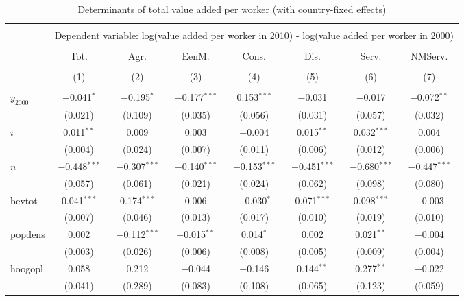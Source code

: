 
\begin{table} \centering \small
  \caption{Determinants of total value added per worker (with country-fixed effects)} 
  \label{FEtable} 
\begin{tabular}{@{\extracolsep{5pt}}lccccccc} 
\\[-1.8ex]\hline 
\hline \\[-1.8ex] 
 & \multicolumn{7}{c}{Dependent variable: log(value added per worker in 2010) - log(value added per worker in 2000)} \\ 
\cline{2-8} 
\\[-1.8ex] & Tot. & Agr. & EenM. & Cons. & Dis. & Serv. & NMServ. \\ 
\\[-1.8ex] & (1) & (2) & (3) & (4) & (5) & (6) & (7)\\ 
\hline \\[-1.8ex] 
 $y_{2000}$ & $-$0.041$^{*}$ & $-$0.195$^{*}$ & $-$0.177$^{***}$ & 0.153$^{***}$ & $-$0.031 & $-$0.017 & $-$0.072$^{**}$ \\ 
  & (0.021) & (0.109) & (0.035) & (0.056) & (0.031) & (0.057) & (0.032) \\ 
  $i$ & 0.011$^{**}$ & 0.009 & 0.003 & $-$0.004 & 0.015$^{**}$ & 0.032$^{***}$ & 0.004 \\ 
  & (0.004) & (0.024) & (0.007) & (0.011) & (0.006) & (0.012) & (0.006) \\ 
  $n$ & $-$0.448$^{***}$ & $-$0.307$^{***}$ & $-$0.140$^{***}$ & $-$0.153$^{***}$ & $-$0.451$^{***}$ & $-$0.680$^{***}$ & $-$0.447$^{***}$ \\ 
  & (0.057) & (0.061) & (0.021) & (0.024) & (0.062) & (0.098) & (0.080) \\ 
  bevtot & 0.041$^{***}$ & 0.174$^{***}$ & 0.006 & $-$0.030$^{*}$ & 0.071$^{***}$ & 0.098$^{***}$ & $-$0.003 \\ 
  & (0.007) & (0.046) & (0.013) & (0.017) & (0.010) & (0.019) & (0.010) \\ 
  popdens & 0.002 & $-$0.112$^{***}$ & $-$0.015$^{**}$ & 0.014$^{*}$ & 0.002 & 0.021$^{**}$ & $-$0.004 \\ 
  & (0.003) & (0.026) & (0.006) & (0.008) & (0.005) & (0.009) & (0.004) \\ 
  hoogopl & 0.058 & 0.212 & $-$0.044 & $-$0.146 & 0.144$^{**}$ & 0.277$^{**}$ & $-$0.022 \\ 
  & (0.041) & (0.289) & (0.083) & (0.108) & (0.065) & (0.123) & (0.059) \\ 

\end{tabular}
\end{table}
